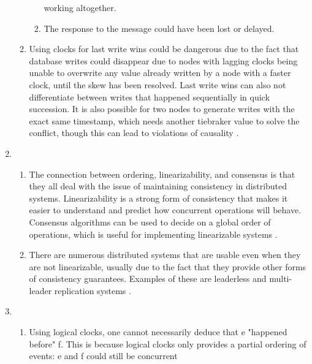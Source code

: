 \begin{enumerate}
\begin{enumerate}
\begin{enumerate}
                    working altogether.
                \item The response to the message could have been lost or 
                    delayed.
            \end{enumerate}
            \autocite[p.~278]{kleppmann_2017}
        \item Using clocks for last write wins could be dangerous due to the
            fact that database writes could disappear due to nodes with 
            lagging clocks being unable to overwrite any value already written
            by a node with a faster clock, until the skew has been resolved.
            Last write wins can also not differentiate between writes that
            happened sequentially in quick succession. It is also possible for 
            two nodes to generate writes with the exact same timestamp, which
            needs another tiebraker value to solve the conflict, though this 
            can lead to violations of causality 
            \autocite[pp.~292-293]{kleppmann_2017}.
    \end{enumerate}
    \item 
    \begin{enumerate}
        \item The connection between ordering, linearizability, and consensus
            is that they all deal with the issue of maintaining consistency in 
            distributed systems. Linearizability is a strong form of consistency 
            that makes it easier to understand and predict how concurrent 
            operations will behave. Consensus algorithms can be used to decide 
            on a global order of operations, which is useful for implementing 
            linearizable systems \autocite[pp.~373-375]{kleppmann_2017}.
        \item There are numerous distributed systems that are usable even when
            they are not linearizable, usually due to the fact that they provide
            other forms of consistency guarantees. Examples of these are 
            leaderless and multi-leader replication systems 
            \autocite[p.~375]{kleppmann_2017}. 
    \end{enumerate}
    \item 
    \begin{enumerate}
        \item Using logical clocks, one cannot necessarily deduce that e
            "happened before" f. This is because logical clocks only provides
            a partial ordering of events: e and f could still be concurrent 

\end{enumerate}
\end{enumerate}
